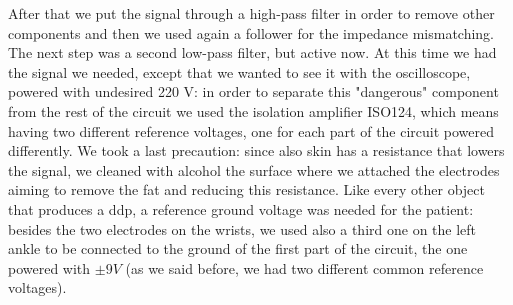 After that we put the signal through a high-pass filter in order to remove other components and then we used again a follower for the impedance mismatching. The next step was a second low-pass filter, but active now. At this time we had the signal we needed, except that we wanted to see it with the oscilloscope, powered with undesired 220 V: in order to separate this "dangerous" component from the rest of the circuit we used the isolation amplifier ISO124, which means having two different reference voltages, one for each part of the circuit powered differently.
We took a last precaution: since also skin has a resistance that lowers the signal, we cleaned with alcohol the surface where we attached the electrodes aiming to remove the fat and reducing this resistance.
Like every other object that produces a ddp, a reference ground voltage was needed for the patient: besides the two electrodes on the wrists, we used also a third one on the left ankle to be connected to the ground of the first part of the circuit, the one powered with $\pm 9 V$ (as we said before, we had two different common reference voltages).

